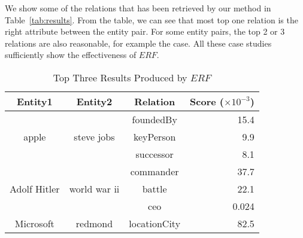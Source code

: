 We show some of the relations that has been retrieved by our method in Table~\ref{tab:results}.
From the table, we can see that most top one relation is the right attribute between the entity pair.
For some entity pairs, the top 2 or 3 relations are also reasonable, for example the  case.
All these case studies sufficiently show the effectiveness of $ERF$.
\begin{table}[!t]
  \centering
  \caption{Top Three Results Produced by $ERF$}
  \small
    \begin{tabular}{cccr}
    \toprule
    Entity1 & Entity2 & Relation & Score ($\times10^{-3}$) \\
    \midrule
    \multicolumn{1}{c}{\multirow{3}{*}{\parbox{1cm}{\centering apple}}} & \multicolumn{1}{c}{\multirow{3}[0]{*}{steve jobs}} & foundedBy & 15.4 \\
    \multicolumn{1}{c}{} & \multicolumn{1}{c}{} & keyPerson & 9.9 \\
    \multicolumn{1}{c}{} & \multicolumn{1}{c}{} & successor & 8.1 \\
    \hline
    \multicolumn{1}{c}{\multirow{3}{*}{\parbox{1cm}{\centering\small\vspace{-1.6mm}  Adolf Hitler}}} & \multicolumn{1}{c}{\multirow{3}[0]{*}{world war ii}} & commander & 37.7 \\
    \multicolumn{1}{c}{} & \multicolumn{1}{c}{} & battle & 22.1 \\
    \multicolumn{1}{c}{} & \multicolumn{1}{c}{} & ceo   & 0.024 \\
    \hline
    \multicolumn{1}{c}{\multirow{3}{*}{\parbox{1cm}{\centering Microsoft}}} & \multicolumn{1}{c}{\multirow{3}[0]{*}{redmond}} & locationCity & 82.5 \\

\end{tabular}
\end{table}
